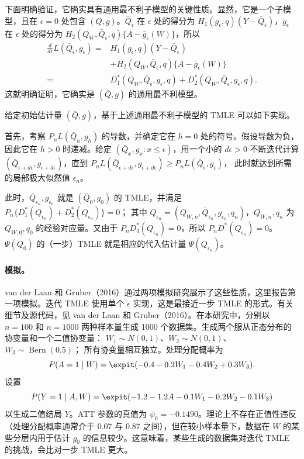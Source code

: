 下面明确验证，它确实具有通用最不利子模型的关键性质。显然，它是一个子模型，且在 $\epsilon=0$ 处包含 $(Q,g)$。$\bar Q_\epsilon$ 在 $\epsilon$ 处的得分为 $H_1(g_\epsilon,q)(Y-\bar Q_\epsilon)$，$g_\epsilon$ 在 $\epsilon$ 处的得分为 $H_2(Q_W,\bar Q_\epsilon,q)\{A-\bar g_\epsilon(W)\}$，所以
\[
 \begin{aligned}
 \frac{d}{d\epsilon}L(\bar Q_\epsilon,g_\epsilon)
 ={}&H_1(g_\epsilon,q)(Y-\bar Q_\epsilon)\\
 &+H_2(Q_W,\bar Q_\epsilon,q)\{A-\bar g_\epsilon(W)\}\\
 ={}&D_1^*(Q_W,\bar Q_\epsilon,g_\epsilon,q)
 +D_2^*(Q_W,\bar Q_\epsilon,g_\epsilon,q).
 \end{aligned}
\]
这就明确证明，它确实是 $(\bar Q,g)$ 的通用最不利模型。

给定初始估计量 $(\bar Q,g)$，基于上述通用最不利子模型的 TMLE 可以如下实现。

首先，考察 $P_nL(\bar Q_h,g_h)$ 的导数，并确定它在 $h=0$ 处的符号。假设导数为负，因此它在 $h>0$ 时递减。给定 $(\bar Q_x,g_x:x\leq\epsilon)$，用一个小的 $d\epsilon>0$ 不断迭代计算 $(\bar Q_{\epsilon+d\epsilon},g_{\epsilon+d\epsilon})$，直到
$P_nL(\bar Q_{\epsilon+d\epsilon},g_{\epsilon+d\epsilon})\geq P_nL(\bar Q_\epsilon,g_\epsilon)$，
此时就达到所需的局部极大似然值 $\epsilon_n$。

此时，$\bar Q_{\epsilon_n},g_{\epsilon_n}$ 就是 $(\bar Q_0,g_0)$ 的 TMLE，并满足
$P_n\{D_1^*(Q_{\epsilon_n})+D_2^*(Q_{\epsilon_n})\}=0$；
其中 $Q_{\epsilon_n}=(Q_{W,n},\bar Q_{\epsilon_n},g_{\epsilon_n},q_n)$，$Q_{W,n},q_n$ 为 $Q_{W,0},q_0$ 的经验对应量。又由于 $P_nD_3^*(Q_{\epsilon_n})=0$，所以 $P_nD^*(Q_{\epsilon_n})=0$。$\Psi(Q_0)$ 的（一步）TMLE 就是相应的代入估计量 $\Psi(Q_{\epsilon_n})$。

\paragraph{模拟。}
van der Laan 和 Gruber（2016）通过两项模拟研究展示了这些性质，这里报告第一项模拟。迭代 TMLE 使用单个 $\epsilon$ 实现，这是最接近一步 TMLE 的形式。有关细节及源代码，见 van der Laan 和 Gruber（2016）。在本研究中，分别以 $n=100$ 和 $n=1000$ 两种样本量生成 1000 个数据集。生成两个服从正态分布的协变量和一个二值协变量：
$W_1\sim N(0,1)$、$W_2\sim N(0,1)$、$W_3\sim\operatorname{Bern}(0.5)$；
所有协变量相互独立。处理分配概率为
\[
 P(A=1\mid W)=\expit(-0.4-0.2W_1-0.4W_2+0.3W_3).
\]
设置
\[
 P(Y=1\mid A,W)=\expit(-1.2-1.2A-0.1W_1-0.2W_2-0.1W_3)
\]
以生成二值结局 $Y$。ATT 参数的真值为 $\psi_0=-0.1490$。理论上不存在正值性违反（处理分配概率通常介于 0.07 与 0.87 之间），但在较小样本量下，数据在 $W$ 的某些分层内用于估计 $g_0$ 的信息较少。这意味着，某些生成的数据集对迭代 TMLE 的挑战，会比对一步 TMLE 更大。

